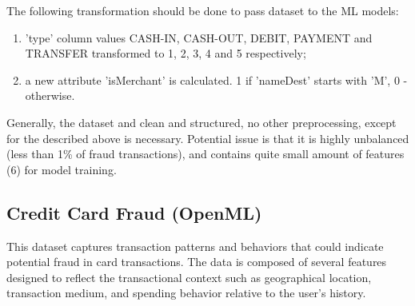 \documentclass[12pt,a4paper, hidelinks]{article}
\begin{document}
The following transformation should be done to pass dataset to the ML models:
\begin{enumerate}
    \item 'type' column values CASH-IN, CASH-OUT, DEBIT, PAYMENT and TRANSFER transformed to 1, 2, 3, 4 and 5 respectively;
    \item a new attribute 'isMerchant' is calculated. 1 if 'nameDest' starts with 'M', 0 - otherwise.
\end{enumerate}

Generally, the dataset and clean and structured, no other preprocessing, except for the described above is necessary. Potential issue is that it is highly unbalanced (less than 1\% of fraud transactions), and contains quite small amount of features (6) for model training. 

\newpage

\subsection{Credit Card Fraud (OpenML)}

This dataset captures transaction patterns and behaviors that could indicate potential fraud in card transactions. The data is composed of several features designed to reflect the transactional context such as geographical location, transaction medium, and spending behavior relative to the user's history.
\end{document}
